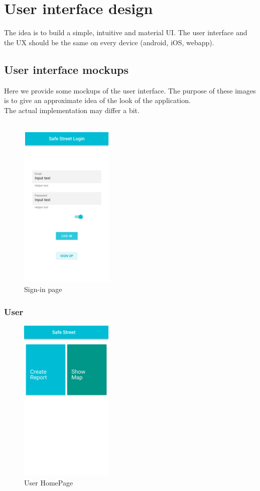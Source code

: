 \documentclass{article}
\begin{document}
\section{User interface design}
\label{sec:UI}
The idea is to build a simple, intuitive and material UI. The user interface and the UX should be the same on every device (android, iOS, webapp).
\subsection{User interface mockups}
Here we provide some mockups of the user interface. The purpose of these images is to give an approximate idea of the look of the application. 
\\ The actual implementation may differ a bit.\\ \\
\begin{figure}[!htb]
		\centering
		\includegraphics[height=7.9cm,keepaspectratio]{images/mockups/Sign_in.png}
		\caption{Sign-in page}
\end{figure}
\clearpage
\subsubsection{User}
\begin{figure}[!htb]
		\centering
		\includegraphics[height=7.9cm,keepaspectratio]{images/mockups/Home_Citizen.png}
		\caption{User HomePage}
\end{figure}
\end{document}
